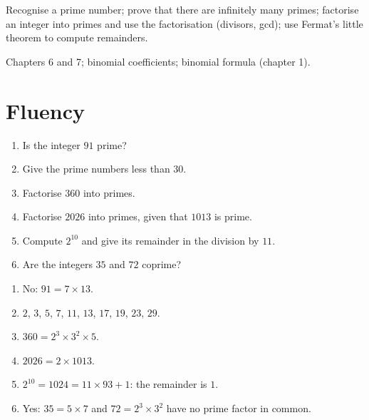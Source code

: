 
\begin{objectives}
Recognise a prime number; prove that there are infinitely many primes; factorise an integer into primes and use the factorisation (divisors, gcd); use Fermat's little theorem to compute remainders.
\end{objectives}
\begin{prerequisites}
Chapters 6 and 7; binomial coefficients; binomial formula (chapter 1).
\end{prerequisites}

\section{Fluency}
\begin{fluency}
\begin{enumerate}
\item Is the integer $91$ prime?
\item Give the prime numbers less than $30$.
\item Factorise $360$ into primes.
\item Factorise $\num{2026}$ into primes, given that $\num{1013}$ is prime.
\item Compute $2^{10}$ and give its remainder in the division by $11$.
\item Are the integers $35$ and $72$ coprime?
\end{enumerate}
\end{fluency}
\begin{solution}[Fluency]
\begin{enumerate}
\item No: $91=7\times13$.
\item $2$, $3$, $5$, $7$, $11$, $13$, $17$, $19$, $23$, $29$.
\item $360=2^3\times3^2\times5$.
\item $\num{2026}=2\times\num{1013}$.
\item $2^{10}=\num{1024}=11\times93+1$: the remainder is $1$.
\item Yes: $35=5\times7$ and $72=2^3\times3^2$ have no prime factor in common.
\end{enumerate}
\end{solution}

\mxnewpage

